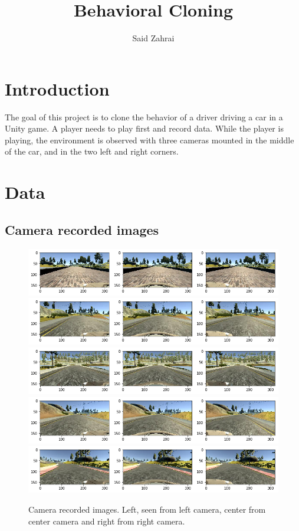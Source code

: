 \documentclass[12pt,a4paper]{article}
\author{Said Zahrai}
\title{Behavioral Cloning}
\begin{document}
	\maketitle
	
	\section{Introduction}
	The goal of this project is to clone the behavior of a driver driving a car in a Unity game. A player needs to play first and record data. While the player is playing, the environment is observed with three cameras mounted in the middle of the car, and in the two left and right corners.
	\section{Data}
	\subsection{Camera recorded images}
	\begin{figure}[H]
		\centering
		\includegraphics[width=0.7\linewidth]{writeup_figures/three_cameras_1}
		\includegraphics[width=0.7\linewidth]{writeup_figures/three_cameras_2}
		\includegraphics[width=0.7\linewidth]{writeup_figures/three_cameras_3}
		\includegraphics[width=0.7\linewidth]{writeup_figures/three_cameras_4}
		\includegraphics[width=0.7\linewidth]{writeup_figures/three_cameras_5}
		\caption{Camera recorded images. Left, seen from left camera, center from center camera and right from right camera.}
		\label{fig:threecameras}
	\end{figure}
\end{document}
